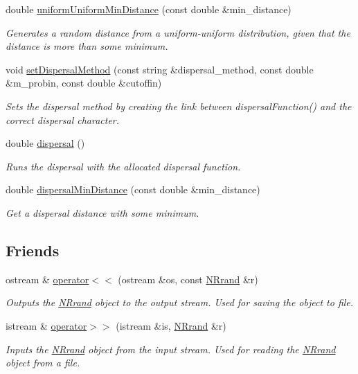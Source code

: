 \begin{DoxyCompactItemize}
double \hyperlink{class_n_rrand_a31cfb60ce2a776bb81479b80f585202f}{uniform\+Uniform\+Min\+Distance} (const double \&min\+\_\+distance)
\begin{DoxyCompactList}\small\item\em Generates a random distance from a uniform-\/uniform distribution, given that the distance is more than some minimum. \end{DoxyCompactList}\item 
void \hyperlink{class_n_rrand_a432b648073ccd3cb7f8215bb5c299619}{set\+Dispersal\+Method} (const string \&dispersal\+\_\+method, const double \&m\+\_\+probin, const double \&cutoffin)
\begin{DoxyCompactList}\small\item\em Sets the dispersal method by creating the link between dispersal\+Function() and the correct dispersal character. \end{DoxyCompactList}\item 
double \hyperlink{class_n_rrand_a1e15746ff8398488245b750325f37b08}{dispersal} ()
\begin{DoxyCompactList}\small\item\em Runs the dispersal with the allocated dispersal function. \end{DoxyCompactList}\item 
double \hyperlink{class_n_rrand_a3cb0629d54b54865403738edd84ba883}{dispersal\+Min\+Distance} (const double \&min\+\_\+distance)
\begin{DoxyCompactList}\small\item\em Get a dispersal distance with some minimum. \end{DoxyCompactList}\end{DoxyCompactItemize}
\subsection*{Friends}
\begin{DoxyCompactItemize}
\item 
ostream \& \hyperlink{class_n_rrand_a604ebc1c878ab63df21e123dbd34185f}{operator$<$$<$} (ostream \&os, const \hyperlink{class_n_rrand}{N\+Rrand} \&r)
\begin{DoxyCompactList}\small\item\em Outputs the \hyperlink{class_n_rrand}{N\+Rrand} object to the output stream. Used for saving the object to file. \end{DoxyCompactList}\item 
istream \& \hyperlink{class_n_rrand_a0b8544414e90bb92ba90afa881b1f06e}{operator$>$$>$} (istream \&is, \hyperlink{class_n_rrand}{N\+Rrand} \&r)
\begin{DoxyCompactList}\small\item\em Inputs the \hyperlink{class_n_rrand}{N\+Rrand} object from the input stream. Used for reading the \hyperlink{class_n_rrand}{N\+Rrand} object from a file. \end{DoxyCompactList}\end{DoxyCompactItemize}


